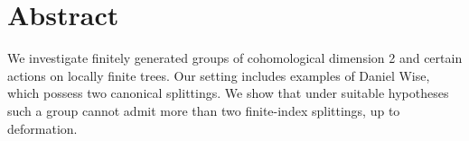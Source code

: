 \documentclass[12pt,parskip=full]{report}
\theoremstyle{plain}
\theoremstyle{definition}
\begin{document}
{%





\newpage
\tableofcontents{}

\newpage
\listoffigures

\newpage



\chapter*{Abstract} %

We investigate finitely generated groups of cohomological dimension 2 and certain actions on locally finite trees. Our setting includes examples of Daniel Wise, which possess two canonical splittings. We show that under suitable hypotheses such a group cannot admit more than two finite-index splittings, up to deformation.

}
\end{document}
